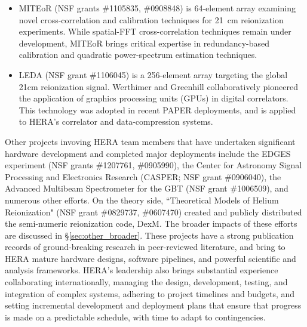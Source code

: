 \documentclass[preprint]{aastex}
\newcommand{\compress}{\vspace{-0.3in}}
\begin{document}
\begin{itemize}[noitemsep,nolistsep]
\item{MITEoR} (NSF grants \#1105835, \#0908848) is 64-element array 
examining novel cross-correlation and calibration techniques for 21~cm reionization experiments.
While spatial-FFT cross-correlation
techniques remain under development, MITEoR brings critical expertise in redundancy-based calibration
and quadratic power-spectrum estimation techniques.

\item{LEDA} (NSF grant \#1106045) is a 256-element array targeting the
global 21cm reionization signal.  Werthimer and Greenhill collaboratively 
pioneered the application of graphics processing units (GPUs) in digital correlators.
This technology was adopted in recent PAPER deployments, and is applied to HERA's correlator
and data-compression systems.

\end{itemize}

\noindent
Other projects invoving HERA team members that have undertaken significant hardware development and
completed major deployments include the EDGES experiment (NSF grants \#1207761, \#0905990),
the Center for Astronomy Signal Processing and Electronics Research (CASPER; NSF grant \#0906040), the Advanced Multibeam
Spectrometer for the GBT (NSF grant \#1006509), and numerous other efforts.  On the theory side, 
``Theoretical Models of Helium Reionization" (NSF grant \#0829737, \#0607470) 
created and publicly distributed the semi-numeric reionization code, DexM.  The broader impacts of these
efforts are discussed in \S\ref{sec:other_broader}.
These projects have a strong publication records of ground-breaking research in peer-reviewed literature, and
bring to HERA mature hardware designs, software pipelines, and powerful scientific and analysis frameworks.
HERA's leadership also brings substantial experience
collaborating internationally, managing the design, development, testing, and integration of complex systems,
adhering to project timelines and budgets, and setting incremental development and deployment plans that
ensure that progress is made on a predictable schedule, with time to adapt to contingencies.

\compress
\end{document}
